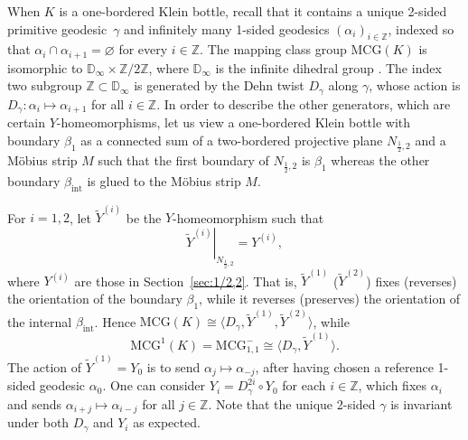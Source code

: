 \documentclass[12pt]{amsart}
\theoremstyle{plain}
\theoremstyle{definition}
\theoremstyle{remark}
\numberwithin{equation}{section}
\begin{document}
When $K$ is a one-bordered Klein bottle, recall that it contains a unique 2-sided primitive geodesic~$\gamma$ and infinitely many 1-sided geodesics $(\alpha_i)_{i\in\mathbb{Z}}$, indexed so that $\alpha_i\cap\alpha_{i+1}=\varnothing$ for every $i\in\mathbb{Z}$. The mapping class group $\mathrm{MCG}(K)$ is isomorphic to $\mathbb{D}_{\infty}\times\mathbb{Z}/2\mathbb{Z}$, where $\mathbb{D}_{\infty}$ is the infinite dihedral group \cite{Kor02,Sze06,Gen17}. The index two subgroup $\mathbb{Z}\subset \mathbb{D}_{\infty}$ is generated by the Dehn twist $D_\gamma$ along $\gamma$, whose action is $D_\gamma:\alpha_i\mapsto\alpha_{i+1}$ for all $i\in\mathbb{Z}$. In order to describe the other generators, which are certain $Y$-homeomorphisms, let us view a one-bordered Klein bottle with boundary $\beta_1$ as a connected sum of a two-bordered projective plane $N_{\frac12,2}$ and a M\"{o}bius strip $M$ such that the first boundary of $N_{\frac12,2}$ is $\beta_1$ whereas the other boundary $\beta_{\mathrm{int}}$ is glued to the M\"{o}bius strip $M$. 

For $i=1,2$, let $\widetilde{Y}^{(i)}$ be the $Y$-homeomorphism such that 
$$
\left.\widetilde{Y}^{(i)}\right|_{N_{\frac12,2}}=Y^{(i)},
$$ 
where $Y^{(i)}$ are those in Section~\ref{sec:1/2,2}. That is, $\widetilde{Y}^{(1)}$ ($\widetilde{Y}^{(2)}$) fixes (reverses) the orientation of the boundary $\beta_1$, while it reverses (preserves) the orientation of the internal $\beta_{\mathrm{int}}$. Hence $\mathrm{MCG}(K)\cong\langle D_{\gamma}, \widetilde{Y}^{(1)}, \widetilde{Y}^{(2)}\rangle$, while
$$
\mathrm{MCG}^1(K)=\mathrm{MCG}_{1,1}^-\cong\langle D_{\gamma}, \widetilde{Y}^{(1)}\rangle.
$$
The action of $\widetilde{Y}^{(1)}=Y_0$ is to send $\alpha_{j}\mapsto\alpha_{-j}$, after having chosen a reference 1-sided geodesic $\alpha_0$. One can consider $Y_i=D_\gamma^{2i}\circ Y_0$ for each $i\in\mathbb{Z}$, which fixes $\alpha_i$ and sends $\alpha_{i+j}\mapsto\alpha_{i-j}$ for all $j\in\mathbb{Z}$. Note that the unique 2-sided $\gamma$ is invariant under both $D_\gamma$ and $Y_i$ as expected.

%
\end{document}
